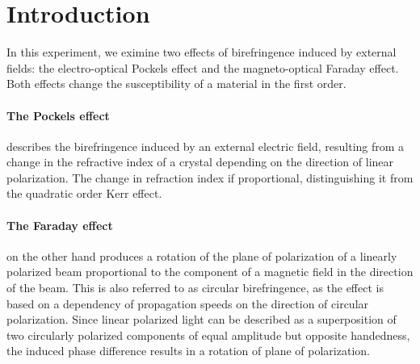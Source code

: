 \section{Introduction}
In this experiment, we eximine two effects of birefringence induced by 
external fields: the electro-optical Pockels effect and the magneto-optical 
Faraday effect. Both effects change the susceptibility of a material 
in the first order. 

\paragraph{The Pockels effect} describes the birefringence induced by
an external electric field, resulting from a change in the refractive index 
of a crystal depending on the direction of linear polarization. The change 
in refraction index if proportional, distinguishing it from the quadratic order 
Kerr effect.

\paragraph{The Faraday effect} on the other hand produces a rotation 
of the plane of polarization of a linearly polarized beam proportional 
to the component of a magnetic field in the direction of the beam. This 
is also referred to as circular birefringence, as the effect is based 
on a dependency of propagation speeds on the direction of circular 
polarization. Since linear polarized light can be described as a 
superposition of two circularly polarized components of equal amplitude 
but opposite handedness, the induced phase difference results in a 
rotation of plane of polarization. 
